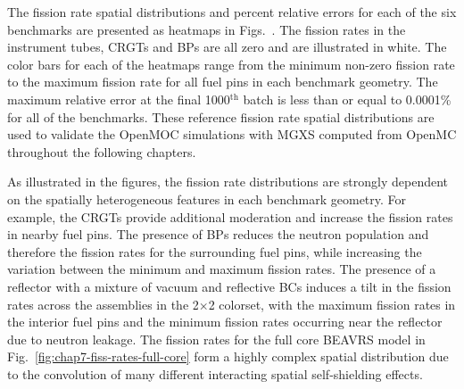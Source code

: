 The fission rate spatial distributions and percent relative errors for each of the six benchmarks are presented as heatmaps in Figs.~. The fission rates in the instrument tubes, \acp{CRGT} and \acp{BP} are all zero and are illustrated in white. The color bars for each of the heatmaps range from the minimum non-zero fission rate to the maximum fission rate for all fuel pins in each benchmark geometry. The maximum relative error at the final 1000$^{\text{th}}$ batch is less than or equal to 0.0001\% for all of the benchmarks. These reference fission rate spatial distributions are used to validate the OpenMOC simulations with \ac{MGXS} computed from OpenMC throughout the following chapters.


As illustrated in the figures, the fission rate distributions are strongly dependent on the spatially heterogeneous features in each benchmark geometry. For example, the \acp{CRGT} provide additional moderation and increase the fission rates in nearby fuel pins. The presence of \acp{BP} reduces the neutron population and therefore the fission rates for the surrounding fuel pins, while increasing the variation between the minimum and maximum fission rates. The presence of a reflector with a mixture of vacuum and reflective \acp{BC} induces a tilt in the fission rates across the assemblies in the 2$\times$2 colorset, with the maximum fission rates in the interior fuel pins and the minimum fission rates occurring near the reflector due to neutron leakage. The fission rates for the full core \ac{BEAVRS} model in Fig.~\ref{fig:chap7-fiss-rates-full-core} form a highly complex spatial distribution due to the convolution of many different interacting spatial self-shielding effects.

